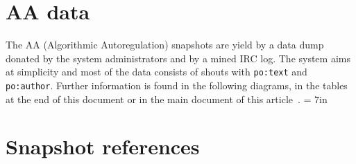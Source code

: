 \documentclass[review]{elsarticle}
\newcommand{\te}[1] {\texttt{\footnotesize#1}}
\begin{document}

\section{AA data}
The AA (Algorithmic Autoregulation) snapshots are yield by a data dump donated by the system
administrators and by a mined IRC log.
The system aims at simplicity and most of the data consists of
shouts with \te{po:text} and \te{po:author}.
Further information is found in the following diagrams, in the tables at
the end of this document or in the main document of this article~\cite{losd}.
\textheight = 7in
\pdfpageheight \foobar
{}

\section{Snapshot references}
\label{sreferences}
\pdfpageheight 10in

\end{document}
